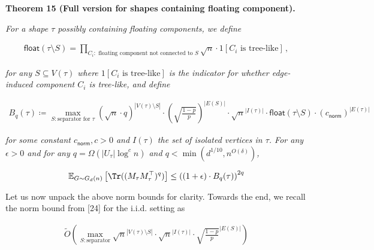 



\par\medskip\noindent\textbf{
\textbf{Theorem 15}\textbf{ }(Full version for shapes containing floating component)\textbf{.}
}\par



\emph{For a shape $\tau$ possibly containing floating components, we define}\par


\[\begin{gathered}
\mathsf{float}(\tau\setminus S)=\prod_{C_{i}:\text{ floating component not connected to }S}\sqrt{n}\cdot 1[C_{i}\text{ is tree-like}]\,,
\end{gathered}\]


\emph{for any $S\subseteq V(\tau)$ where $1[C_{i}\text{ is tree-like}]$ is the indicator for whether edge-induced component $C_{i}$ is tree-like,
and define}\par




\[\begin{gathered}
\displaystyle B_{q}(\tau)\coloneqq\max_{S:\text{separator for }\tau}(\sqrt{n}\cdot q)^{|V(\tau)\setminus S|}\cdot\left(\sqrt{\frac{1-p}{p}}\right)^{|E(S)|}\cdot\sqrt{n}^{|I(\tau)|}\cdot\mathsf{float}(\tau\setminus S)\cdot(c_{\mathsf{norm}})^{|E(\tau)|}
\end{gathered}\]


\emph{for some constant $c_{\mathsf{norm}},c>0$ and $I(\tau)$ the set of isolated vertices in $\tau$.
For any $\epsilon>0$ and for any $q=\Omega(|U_{\tau}|\log^{c}n)$ and $q<\min(d^{1/10},n^{O(\delta)})$,}\par


\[\begin{gathered}
\mathbb{E}_{G\sim G_{d}(n)}\left[\Tr((M_{\tau}M_{\tau}^{\top})^{q})\right]\leq\left((1+\epsilon)\cdot B_{q}(\tau)\right)^{2q}
\end{gathered}\]






Let us now unpack the above norm bounds for clarity. Towards the end, we recall the norm bound from [24] for the i.i.d. setting as\par


\[\begin{gathered}
\tilde{O}(\max_{S:\text{separator}}\sqrt{n}^{|V(\tau)\setminus S|}\cdot\sqrt{n}^{|I(\tau)|}\cdot\sqrt{\frac{1-p}{p}}^{|E(S)|})
\end{gathered}\]


